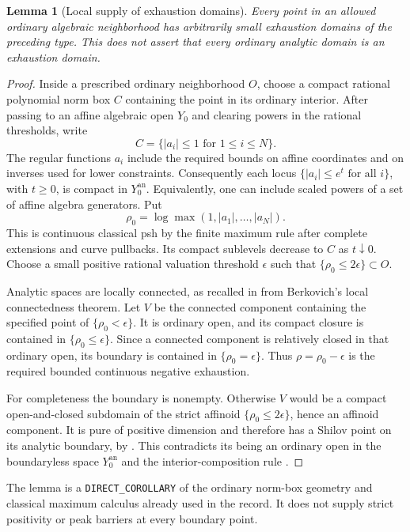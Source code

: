\documentclass[11pt,a4paper]{article}
\numberwithin{equation}{section}
\newtheorem{lemma}[theorem]{Lemma}
\theoremstyle{definition}
\theoremstyle{remark}
\newcommand{\an}{\mathrm{an}}
\begin{document}
\begin{lemma}[Local supply of exhaustion domains]
\label{lem:r2-local-exhaustion-domains}
Every point in an allowed ordinary algebraic neighborhood has
arbitrarily small exhaustion domains of the preceding type.
This does not assert that every ordinary analytic domain is an
exhaustion domain.
\end{lemma}

\begin{proof}
Inside a prescribed ordinary neighborhood $O$, choose a compact
rational polynomial norm box $C$ containing the point in its
ordinary interior. After passing to an affine algebraic open
$Y_0$ and clearing powers in the rational thresholds, write
\[
 C=\{|a_i|\leq1\text{ for }1\leq i\leq N\}.
\]
The regular functions $a_i$ include the required bounds on
affine coordinates and on inverses used for lower constraints.
Consequently each locus $\{|a_i|\leq e^t\text{ for all }i\}$,
with $t\geq0$, is compact in $Y_0^{\an}$. Equivalently, one
can include scaled powers of a set of affine algebra generators.
Put
\[
 \rho_0=\log\max(1,|a_1|,\ldots,|a_N|).
\]
This is continuous classical psh by the finite maximum rule
after complete extensions and curve pullbacks. Its compact
sublevels decrease to $C$ as $t\downarrow0$. Choose a small
positive rational valuation threshold $\epsilon$ such that
$\{\rho_0\leq2\epsilon\}\subset O$.

Analytic spaces are locally connected, as recalled in
\cite{GR25} from Berkovich's local connectedness theorem.
Let $V$ be the connected component containing the specified
point of $\{\rho_0<\epsilon\}$. It is ordinary open, and its
compact closure is contained in $\{\rho_0\leq\epsilon\}$.
Since a connected component is relatively closed in that
ordinary open, its boundary is contained in
$\{\rho_0=\epsilon\}$. Thus $\rho=\rho_0-\epsilon$ is the
required bounded continuous negative exhaustion.

For completeness the boundary is nonempty. Otherwise $V$
would be a compact open-and-closed subdomain of the strict
affinoid $\{\rho_0\leq2\epsilon\}$, hence an affinoid
component. It is pure of positive dimension and therefore has
a Shilov point on its analytic boundary, by
\cite[Lemma~6.2]{GR25}. This contradicts its being an ordinary
open in the boundaryless space $Y_0^{\an}$ and the
interior-composition rule \cite[\S2.11(3)--(4)]{GR25}.
\end{proof}

The lemma is a \texttt{DIRECT\_COROLLARY} of the ordinary
norm-box geometry and classical maximum calculus already used
in the record. It does not supply strict positivity or peak
barriers at every boundary point.
\end{document}

